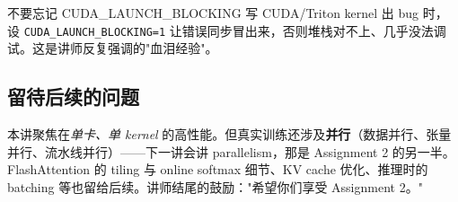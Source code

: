 \documentclass[a4paper]{article}
\begin{document}
\begin{warningbox}{不要忘记 CUDA\_LAUNCH\_BLOCKING}
写 CUDA/Triton kernel 出 bug 时，设 \texttt{CUDA\_LAUNCH\_BLOCKING=1} 让错误同步冒出来，否则堆栈对不上、几乎没法调试。这是讲师反复强调的"血泪经验"。
\end{warningbox}

\subsection{留待后续的问题}

本讲聚焦在\emph{单卡、单 kernel} 的高性能。但真实训练还涉及\textbf{并行}（数据并行、张量并行、流水线并行）——下一讲会讲 parallelism，那是 Assignment 2 的另一半。FlashAttention 的 tiling 与 online softmax 细节、KV cache 优化、推理时的 batching 等也留给后续。讲师结尾的鼓励："希望你们享受 Assignment 2。"
\end{document}
